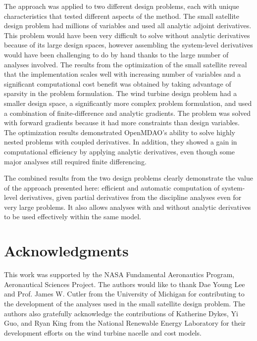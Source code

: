 \documentclass[]{aiaa-tc} %
\begin{document}
      The approach was applied to two different design problems, each with unique characteristics that
      tested different aspects of the method. The small satellite design problem had millions of variables and used all analytic adjoint derivatives.
      This problem would have been very difficult to solve without analytic derivatives because of its large design spaces, however assembling the
      system-level derivatives would have been challenging to do by hand thanks to the large number of analyses involved.
      The results from the optimization of the small satellite reveal that the implementation scales well with increasing
      number of variables and a significant computational cost benefit was obtained by taking advantage of
      sparsity in the problem formulation. The wind turbine design problem had a smaller design space, a
      significantly more complex problem formulation, and used a combination of finite-difference and analytic
      gradients. The problem was solved with forward gradients because it had more constraints than design variables.
      The optimization results demonstrated OpenMDAO's ability to solve highly nested problems with coupled derivatives.
      In addition, they showed a gain in computational efficiency by applying analytic derivatives, even though some major
      analyses still required finite differencing.

      The combined results from the two design problems clearly demonstrate the value of the approach presented here: efficient and
      automatic computation of system-level derivatives, given partial derivatives from the discipline analyses
      even for very large problems. It also allows analyses with and without analytic derivatives to be used effectively
      within the same model.


  \section{Acknowledgments}

      This work was supported by the NASA Fundamental Aeronautics Program, Aeronautical Sciences Project.
      The authors would like to thank Dae Young Lee and Prof. James W. Cutler from the University of Michigan
      for contributing to the development of the analyses used in the small satellite design problem.  The authors also gratefully acknowledge the contributions of Katherine Dykes, Yi Guo, and Ryan King from the National Renewable Energy Laboratory for their development efforts on the wind turbine nacelle and cost models.

  
\end{document}
